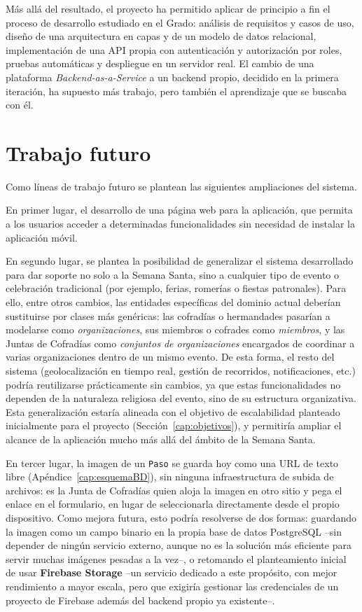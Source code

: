 Más allá del resultado, el proyecto ha permitido aplicar de principio a fin el proceso de desarrollo estudiado en el Grado: análisis de requisitos y casos de uso, diseño de una arquitectura en capas y de un modelo de datos relacional, implementación de una API propia con autenticación y autorización por roles, pruebas automáticas y despliegue en un servidor real. El cambio de una plataforma \emph{Backend-as-a-Service} a un backend propio, decidido en la primera iteración, ha supuesto más trabajo, pero también el aprendizaje que se buscaba con él.

\section{Trabajo futuro}\label{cap:trabajo_futuro}

Como líneas de trabajo futuro se plantean las siguientes ampliaciones del sistema.

En primer lugar, el desarrollo de una página web para la aplicación, que permita a los usuarios acceder a determinadas funcionalidades sin necesidad de instalar la aplicación móvil.

En segundo lugar, se plantea la posibilidad de generalizar el sistema desarrollado para dar soporte no solo a la Semana Santa, sino a cualquier tipo de evento o celebración tradicional (por ejemplo, ferias, romerías o fiestas patronales). Para ello, entre otros cambios, las entidades específicas del dominio actual deberían sustituirse por clases más genéricas: las cofradías o hermandades pasarían a modelarse como \textit{organizaciones}, sus miembros o cofrades como \textit{miembros}, y las Juntas de Cofradías como \textit{conjuntos de organizaciones} encargados de coordinar a varias organizaciones dentro de un mismo evento. De esta forma, el resto del sistema (geolocalización en tiempo real, gestión de recorridos, notificaciones, etc.) podría reutilizarse prácticamente sin cambios, ya que estas funcionalidades no dependen de la naturaleza religiosa del evento, sino de su estructura organizativa. Esta generalización estaría alineada con el objetivo de escalabilidad planteado inicialmente para el proyecto (Sección~\ref{cap:objetivos}), y permitiría ampliar el alcance de la aplicación mucho más allá del ámbito de la Semana Santa.

En tercer lugar, la imagen de un \texttt{Paso} se guarda hoy como una URL de texto libre (Apéndice~\ref{cap:esquemaBD}), sin ninguna infraestructura de subida de archivos: es la Junta de Cofradías quien aloja la imagen en otro sitio y pega el enlace en el formulario, en lugar de seleccionarla directamente desde el propio dispositivo. Como mejora futura, esto podría resolverse de dos formas: guardando la imagen como un campo binario en la propia base de datos PostgreSQL --sin depender de ningún servicio externo, aunque no es la solución más eficiente para servir muchas imágenes pesadas a la vez--, o retomando el planteamiento inicial de usar \textbf{Firebase Storage} \cite{firebasestorage} --un servicio dedicado a este propósito, con mejor rendimiento a mayor escala, pero que exigiría gestionar las credenciales de un proyecto de Firebase además del backend propio ya existente--.

